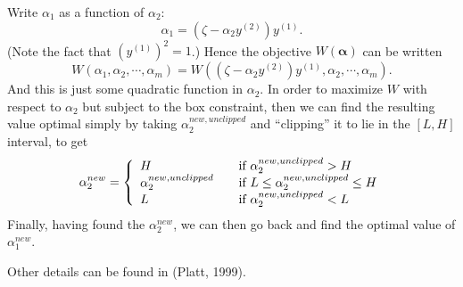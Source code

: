 \documentclass[a4paper]{book}
\newcommand{\bs}{\boldsymbol}
\begin{document}
Write $\alpha_1$ as a function of $\alpha_2$:
\begin{equation}
	\alpha_1 = (\zeta - \alpha_2 y^{(2)})y^{(1)}.
\end{equation}
(Note the fact that $(y^{(1)})^2=1$.) Hence the objective $W(\bs{\alpha})$ can be written
\begin{equation}
	W(\alpha_1,\alpha_2,\cdots,\alpha_m) = W((\zeta - \alpha_2 y^{(2)})y^{(1)},\alpha_2,\cdots,\alpha_m).
\end{equation}
And this is just some quadratic function in $\alpha_2$. In order to maximize $W$ with respect to $\alpha_2$ but subject to the box constraint, then we can find the resulting value optimal simply by taking $\alpha_2^{new,unclipped}$ and ``clipping'' it to lie in the $[L,H]$ interval, to get
\begin{equation}
	\alpha_2^{new} =  \left\{ 
	  \begin{array}{l l}
	    H & \quad \text{if $\alpha_2^{new,unclipped} > H$}\\
	    \alpha_2^{new, unclipped} & \quad \text{if $L \leq \alpha_2^{new,unclipped} \leq H$}\\
	    L &\quad \text{if $\alpha_2 ^{new,unclipped} < L$} 
	  \end{array} \right.
\end{equation}
Finally, having found the $\alpha_2^{new}$, we can then go back and find the optimal value of $\alpha_1^{new}$.

Other details can be found in (Platt, 1999).
\end{document}
